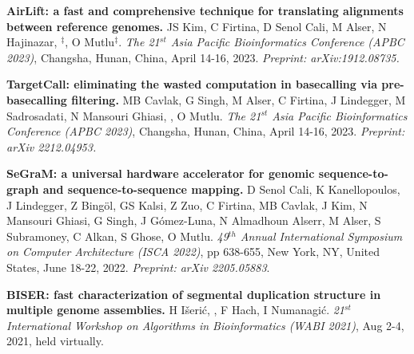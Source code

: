 



\vspace{-.2cm}
{\bf AirLift: a fast and comprehensive technique for translating alignments between reference genomes.} JS Kim, C Firtina, D Senol Cali, M Alser, N Hajinazar, \calkan{}$^\ddag$, O Mutlu$^\ddag$. {\em The 21$^{st}$ Asia Pacific Bioinformatics Conference (APBC 2023)}, Changsha, Hunan, China, April 14-16, 2023.  \textit{Preprint: arXiv:1912.08735.}

\vspace{-.2cm}
{\bf TargetCall: eliminating the wasted computation in basecalling via pre-basecalling filtering.}  
MB Cavlak, G Singh, M Alser, C Firtina, J Lindegger, M Sadrosadati, N Mansouri Ghiasi, \calkan{}, O Mutlu. {\em The 21$^{st}$ Asia Pacific Bioinformatics Conference (APBC 2023)}, Changsha, Hunan, China, April 14-16, 2023.
\textit{Preprint: arXiv 2212.04953.}

\vspace{-.2cm}
{\bf 
SeGraM: a universal hardware accelerator for genomic sequence-to-graph and sequence-to-sequence mapping.} 
D Senol Cali, K Kanellopoulos, J Lindegger, Z Bingöl, GS Kalsi, Z Zuo, C Firtina, MB Cavlak, J Kim, N Mansouri Ghiasi, G Singh, J Gómez-Luna, N Almadhoun Alserr, M Alser, S Subramoney, C Alkan, S Ghose, O Mutlu.
{\em 49$^{th}$ Annual International Symposium on Computer Architecture (ISCA 2022)}, pp 638-655, New York, NY, United States, June 18-22, 2022.
\textit{Preprint: arXiv 2205.05883}.


\vspace{-.2cm}
{\bf BISER: fast characterization of segmental
duplication structure in multiple genome
assemblies.} H  Išerić, \calkan{}, F Hach, I Numanagić. 
{\em 21$^{st}$ International Workshop on Algorithms in Bioinformatics (WABI 2021)}, Aug 2-4, 2021, held virtually. 

